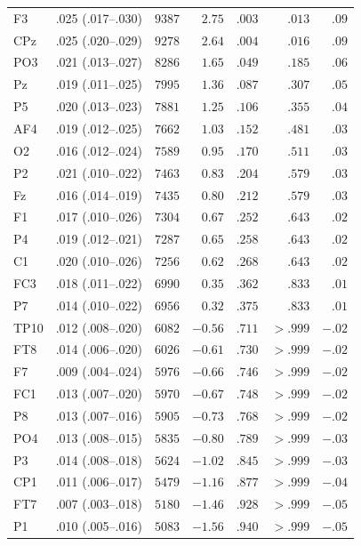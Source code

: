 {\begin{longtable}{llrrrrr}
F3 & .025 (.017--.030) & $9387$ & $2.75$ & $.003$ & $.013$ & $.09$ \\
CPz & .025 (.020--.029) & $9278$ & $2.64$ & $.004$ & $.016$ & $.09$ \\
PO3 & .021 (.013--.027) & $8286$ & $1.65$ & $.049$ & $.185$ & $.06$ \\
Pz & .019 (.011--.025) & $7995$ & $1.36$ & $.087$ & $.307$ & $.05$ \\
P5 & .020 (.013--.023) & $7881$ & $1.25$ & $.106$ & $.355$ & $.04$ \\
AF4 & .019 (.012--.025) & $7662$ & $1.03$ & $.152$ & $.481$ & $.03$ \\
O2 & .016 (.012--.024) & $7589$ & $0.95$ & $.170$ & $.511$ & $.03$ \\
P2 & .021 (.010--.022) & $7463$ & $0.83$ & $.204$ & $.579$ & $.03$ \\
Fz & .016 (.014--.019) & $7435$ & $0.80$ & $.212$ & $.579$ & $.03$ \\
F1 & .017 (.010--.026) & $7304$ & $0.67$ & $.252$ & $.643$ & $.02$ \\
P4 & .019 (.012--.021) & $7287$ & $0.65$ & $.258$ & $.643$ & $.02$ \\
C1 & .020 (.010--.026) & $7256$ & $0.62$ & $.268$ & $.643$ & $.02$ \\
FC3 & .018 (.011--.022) & $6990$ & $0.35$ & $.362$ & $.833$ & $.01$ \\
P7 & .014 (.010--.022) & $6956$ & $0.32$ & $.375$ & $.833$ & $.01$ \\
TP10 & .012 (.008--.020) & $6082$ & $-0.56$ & $.711$ & $> .999$ & $-.02$ \\
FT8 & .014 (.006--.020) & $6026$ & $-0.61$ & $.730$ & $> .999$ & $-.02$ \\
F7 & .009 (.004--.024) & $5976$ & $-0.66$ & $.746$ & $> .999$ & $-.02$ \\
FC1 & .013 (.007--.020) & $5970$ & $-0.67$ & $.748$ & $> .999$ & $-.02$ \\
P8 & .013 (.007--.016) & $5905$ & $-0.73$ & $.768$ & $> .999$ & $-.02$ \\
PO4 & .013 (.008--.015) & $5835$ & $-0.80$ & $.789$ & $> .999$ & $-.03$ \\
P3 & .014 (.008--.018) & $5624$ & $-1.02$ & $.845$ & $> .999$ & $-.03$ \\
CP1 & .011 (.006--.017) & $5479$ & $-1.16$ & $.877$ & $> .999$ & $-.04$ \\
FT7 & .007 (.003--.018) & $5180$ & $-1.46$ & $.928$ & $> .999$ & $-.05$ \\
P1 & .010 (.005--.016) & $5083$ & $-1.56$ & $.940$ & $> .999$ & $-.05$ \\

\end{longtable}}
